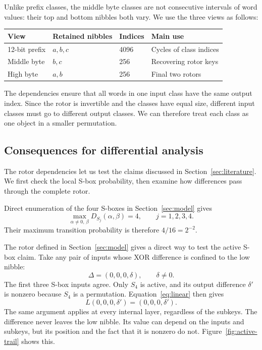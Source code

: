 \documentclass[11pt]{article}
\begin{document}
Unlike prefix classes, the middle byte classes are not consecutive
intervals of word values: their top and bottom nibbles both vary.
We use the three views as follows:
\begin{center}
\begin{tabular}{llll}
\toprule
View & Retained nibbles & Indices & Main use\\
\midrule
12-bit prefix & \(a,b,c\) & 4096 & Cycles of class indices\\
Middle byte & \(b,c\) & 256 & Recovering rotor keys\\
High byte & \(a,b\) & 256 & Final two rotors\\
\bottomrule
\end{tabular}
\end{center}

The dependencies ensure that all words in one input class have the
same output index. Since the rotor is invertible and the classes have
equal size, different input classes must go to different output classes.
We can therefore treat each class as one object in a smaller permutation.

\subsection{Consequences for differential analysis}\label{sec:diffusioncheck}
The rotor dependencies let us test the claims discussed in
Section~\ref{sec:literature}. We first check the local S-box probability,
then examine how differences pass through the complete rotor.

Direct enumeration of the four S-boxes in Section~\ref{sec:model}
gives
\[
\max_{\alpha\ne0,\,\beta}D_{S_j}(\alpha,\beta)=4,
\qquad j=1,2,3,4.
\]
Their maximum transition probability is therefore \(4/16=2^{-2}\).

The rotor defined in Section~\ref{sec:model} gives a direct way to test
the active S-box claim. Take any pair of inputs whose XOR difference
is confined to the low nibble:
\[
\Delta=(0,0,0,\delta),
\qquad \delta\ne0.
\]
The first three S-box inputs agree. Only \(S_4\) is active, and its
output difference \(\delta'\) is nonzero because \(S_4\) is a
permutation. Equation~\eqref{eq:linear} then gives
\[
L(0,0,0,\delta')=(0,0,0,\delta').
\]
The same argument applies at every internal layer, regardless of the
subkeys. The difference never leaves the low nibble. Its value can
depend on the inputs and subkeys, but its position and the fact that
it is nonzero do not. Figure~\ref{fig:active-trail} shows this.
\end{document}
